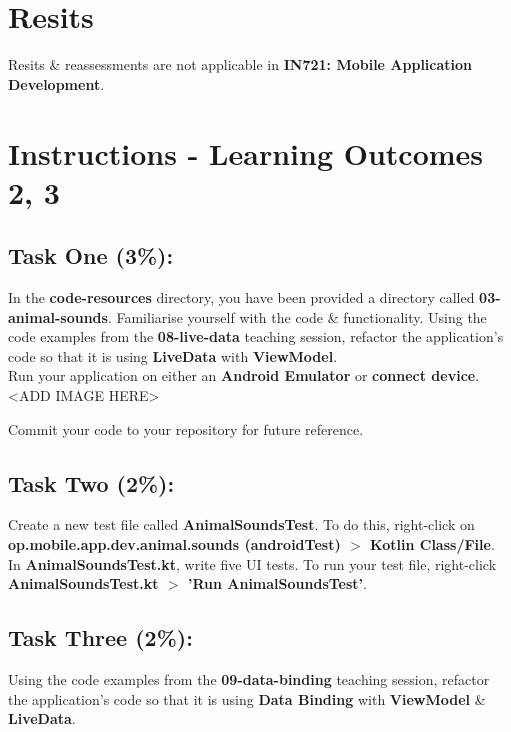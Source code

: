\documentclass{article}
\begin{document}
\section*{Resits}
Resits \& reassessments are not applicable in \textbf{IN721: Mobile Application Development}.

\section*{Instructions - Learning Outcomes 2, 3}
\subsection*{Task One (3\%):}
In the \textbf{code-resources} directory, you have been provided a directory called \textbf{03-animal-sounds}. Familiarise yourself with the code \& functionality. Using the code examples from the \textbf{08-live-data} teaching session, refactor the application's code so that it is using \textbf{LiveData} with \textbf{ViewModel}. \\

Run your application on either an \textbf{Android Emulator} or \textbf{connect device}. \\ 

<ADD IMAGE HERE>

Commit your code to your repository for future reference.

\subsection*{Task Two (2\%):}
Create a new test file called \textbf{AnimalSoundsTest}. To do this, right-click on \textbf{op.mobile.app.dev.animal.sounds (androidTest) $>$ Kotlin Class/File}. In \textbf{AnimalSoundsTest.kt}, write five UI tests. To run your test file, right-click \textbf{AnimalSoundsTest.kt $>$ 'Run AnimalSoundsTest'}.

\subsection*{Task Three (2\%):}
Using the code examples from the \textbf{09-data-binding} teaching session, refactor the application's code so that it is using \textbf{Data Binding} with \textbf{ViewModel} \& \textbf{LiveData}.
\end{document}
